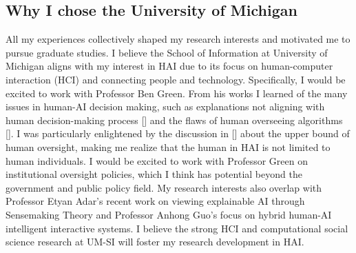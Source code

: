 \subsection*{Why I chose the University of Michigan}


All my experiences collectively shaped my research interests and motivated
me to pursue graduate studies. 
I believe the School of Information at University of Michigan aligns with my interest in HAI due to its focus on human-computer interaction (HCI) and connecting people and technology.
Specifically, I would be excited to work with Professor Ben Green. 
From his works I learned of the many issues in human-AI decision making, such as explanations not aligning with human decision-making process [] and the flaws of human overseeing algorithms []. 
I was particularly enlightened by the discussion in [] about the upper bound of human oversight, making me realize that the human in HAI is not limited to human individuals. 
I would be excited to work with Professor Green on institutional oversight policies, which I think has potential beyond the government and public policy field. 
My research interests also overlap with Professor Etyan Adar's recent work on viewing explainable AI through Sensemaking Theory and Professor Anhong Guo's focus on hybrid human-AI intelligent interactive systems. 
I believe the strong HCI and computational social science research at UM-SI will foster my research development in HAI.


